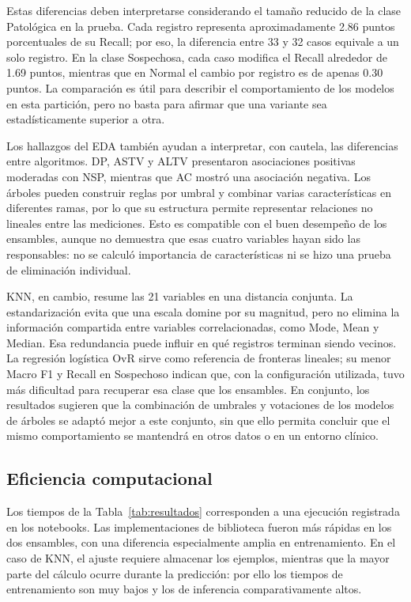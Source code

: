 Estas diferencias deben interpretarse considerando el tamaño reducido de la clase Patológica en la prueba. Cada registro representa aproximadamente 2.86 puntos porcentuales de su Recall; por eso, la diferencia entre 33 y 32 casos equivale a un solo registro. En la clase Sospechosa, cada caso modifica el Recall alrededor de 1.69 puntos, mientras que en Normal el cambio por registro es de apenas 0.30 puntos. La comparación es útil para describir el comportamiento de los modelos en esta partición, pero no basta para afirmar que una variante sea estadísticamente superior a otra.

Los hallazgos del EDA también ayudan a interpretar, con cautela, las diferencias entre algoritmos. DP, ASTV y ALTV presentaron asociaciones positivas moderadas con NSP, mientras que AC mostró una asociación negativa. Los árboles pueden construir reglas por umbral y combinar varias características en diferentes ramas, por lo que su estructura permite representar relaciones no lineales entre las mediciones. Esto es compatible con el buen desempeño de los ensambles, aunque no demuestra que esas cuatro variables hayan sido las responsables: no se calculó importancia de características ni se hizo una prueba de eliminación individual.

KNN, en cambio, resume las 21 variables en una distancia conjunta. La estandarización evita que una escala domine por su magnitud, pero no elimina la información compartida entre variables correlacionadas, como Mode, Mean y Median. Esa redundancia puede influir en qué registros terminan siendo vecinos. La regresión logística OvR sirve como referencia de fronteras lineales; su menor Macro F1 y Recall en Sospechoso indican que, con la configuración utilizada, tuvo más dificultad para recuperar esa clase que los ensambles. En conjunto, los resultados sugieren que la combinación de umbrales y votaciones de los modelos de árboles se adaptó mejor a este conjunto, sin que ello permita concluir que el mismo comportamiento se mantendrá en otros datos o en un entorno clínico.

\subsection{Eficiencia computacional}
Los tiempos de la Tabla~\ref{tab:resultados} corresponden a una ejecuci\'on registrada en los notebooks. Las implementaciones de biblioteca fueron m\'as r\'apidas en los dos ensambles, con una diferencia especialmente amplia en entrenamiento. En el caso de KNN, el ajuste requiere almacenar los ejemplos, mientras que la mayor parte del c\'alculo ocurre durante la predicci\'on: por ello los tiempos de entrenamiento son muy bajos y los de inferencia comparativamente altos.

